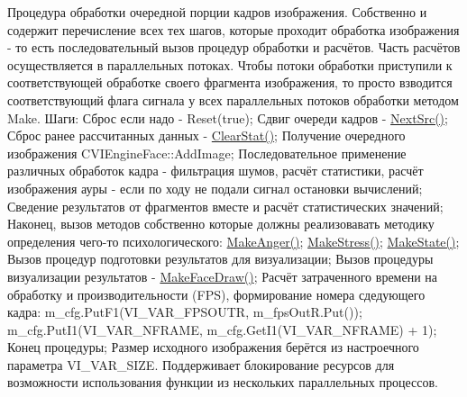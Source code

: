 Процедура обработки очередной порции кадров изображения. Собственно и содержит перечисление всех тех шагов, которые проходит обработка изображения -\/ то есть последовательный вызов процедур обработки и расчётов. Часть расчётов осуществляется в параллельных потоках. Чтобы потоки обработки приступили к соответствующей обработке своего фрагмента изображения, то просто взводится соответствующий флага сигнала у всех параллельных потоков обработки методом Make. Шаги\+: Сброс если надо -\/ Reset(true); Сдвиг очереди кадров -\/ \hyperlink{class_c_v_i_engine_base_aa1aa2604f40dd77bc49ca6ff8fd81535}{Next\+Src()}; Сброс ранее рассчитанных данных -\/ \hyperlink{class_c_v_i_engine_base_a10d6138a2c8f4c4c946bf930c268be6b}{Clear\+Stat()}; Получение очередного изображения C\+V\+I\+Engine\+Face\+::\+Add\+Image; Последовательное применение различных обработок кадра -\/ фильтрация шумов, расчёт статистики, расчёт изображения ауры -\/ если по ходу не подали сигнал остановки вычислений; Сведение результатов от фрагментов вместе и расчёт статистических значений; Наконец, вызов методов собственно которые должны реализовавать методику определения чего-\/то психологического\+: \hyperlink{class_c_v_i_engine_base_adf949a2b1abf18f519937d3f787c5abf}{Make\+Anger()}; \hyperlink{class_c_v_i_engine_base_a746c67a403f60418bf26e1e686db0c0c}{Make\+Stress()}; \hyperlink{class_c_v_i_engine_base_aa77b261660041465a8d3e68a7088dd0d}{Make\+State()}; Вызов процедур подготовки результатов для визуализации; Вызов процедуры визуализации результатов -\/ \hyperlink{class_c_v_i_engine_base_a18c5dc58d55a37295b3dd4c451fb86fc}{Make\+Face\+Draw()}; Расчёт затраченного времени на обработку и производительности (F\+P\+S), формирование номера сдедующего кадра\+: m\+\_\+cfg.\+Put\+F1(V\+I\+\_\+\+V\+A\+R\+\_\+\+F\+P\+S\+O\+U\+T\+R, m\+\_\+fps\+Out\+R.\+Put()); m\+\_\+cfg.\+Put\+I1(V\+I\+\_\+\+V\+A\+R\+\_\+\+N\+F\+R\+A\+M\+E, m\+\_\+cfg.\+Get\+I1(\+V\+I\+\_\+\+V\+A\+R\+\_\+\+N\+F\+R\+A\+M\+E) + 1); Конец процедуры; Размер исходного изображения берётся из настроечного параметра V\+I\+\_\+\+V\+A\+R\+\_\+\+S\+I\+Z\+E. Поддерживает блокирование ресурсов для возможности использования функции из нескольких параллельных процессов. 


